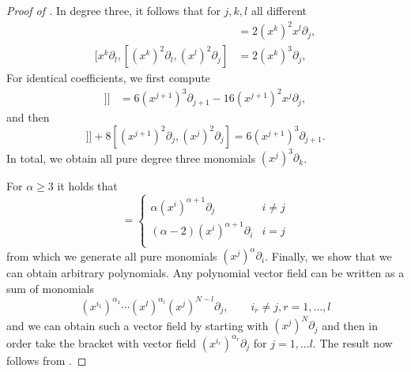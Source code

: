 \documentclass[10pt,a4paper]{amsart}
\begin{document}
\begin{proof}[Proof of ]
In degree three, it follows that for $j,k,l$ all different
\begin{align}
[(x^k)^2\partial_l, (x^l)^2 \partial_j] &= 2(x^k)^2 x^l \partial_j ,\\
[x^k \partial_l, [(x^k)^2\partial_l, (x^l)^2 \partial_j] &= 2(x^k)^3 \partial_j,
\end{align}
For identical coefficients, we first compute
\begin{align}
[x^{j+1}\partial_j, [x^{j+1}\partial_j, [x^{j+1}\partial_j, Y]]] &= 6(x^{j+1})^3 \partial_{j+1} - 16(x^{j+1})^2 x^j \partial_j,
\end{align}
and then
\begin{equation}
[x^{j+1}\partial_j, [x^{j+1}\partial_j, [x^{j+1}\partial_j, Y]]] + 8 [(x^{j+1})^2\partial_j, (x^j)^2 \partial_j] = 6(x^{j+1})^3 \partial_{j+1}.
\end{equation}
In total, we obtain all pure degree three monomials $(x^j)^3 \partial_k$.

For $\alpha \geq 3$ it holds that
\begin{equation}
[(x^i)^2\partial_i, (x^i)^\alpha \partial_j] = \begin{cases}
\alpha(x^i)^{\alpha+1} \partial_j & i \neq j \\
(\alpha-2)(x^i)^{\alpha+1} \partial_i & i = j \\
\end{cases}
\end{equation}
from which we generate all pure monomials $(x^j)^\alpha \partial_i$. Finally, we show that we can obtain arbitrary polynomials. Any polynomial vector field can be written as a sum of monomials
$$(x^{i_1})^{\alpha_1} \cdots (x^{l})^{\alpha_l} (x^j)^{N - l} \partial_j, \qquad i_r \neq j, r=1, \dots, l$$
and we can obtain such a vector field by starting with $(x^j)^N \partial_j$ and then in order take the bracket with vector field $(x^{i_r})^{\alpha_r} \partial_j$ for $j=1, \dots l$. The result now follows from .
\end{proof}
\end{document}

